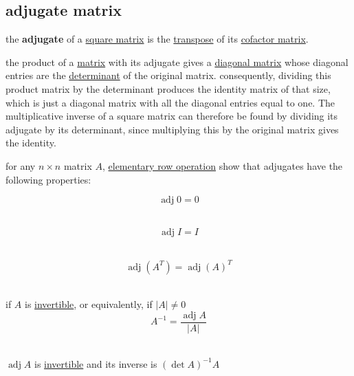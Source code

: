 \documentclass[a4paper,12pt]{article}
\DeclareMathOperator{\adj}{adj}
\begin{document}
\subsection{adjugate matrix}
\label{sec:org517aaf6}
\begin{definition}
the \textbf{adjugate} of a \hyperref[sec:orgf670bc9]{square matrix} is the \hyperref[sec:org668c066]{transpose} of its \hyperref[sec:org47e0d92]{cofactor matrix}.\\

\begin{characteristic}
the product of a \hyperref[sec:org2833a15]{matrix} with its adjugate gives a \hyperref[sec:orgaf43c3e]{diagonal matrix} whose diagonal entries are the \hyperref[sec:orgff9607b]{determinant} of the original matrix. consequently, dividing this product matrix by the determinant produces the identity matrix of that size, which is just a diagonal matrix with all the diagonal entries equal to one. The multiplicative inverse of a square matrix can therefore be found by dividing its adjugate by its determinant, since multiplying this by the original matrix gives the identity.\\
\end{characteristic}

\begin{characteristic}
for any \(n\times n\) matrix \(A\), \hyperref[sec:orgdd80885]{elementary row operation} show that adjugates have the following properties:\\

\begin{lemma}
\[\adj 0 = 0\]\\
\end{lemma}

\begin{lemma}
\[\adj I = I\]\\
\end{lemma}

\begin{lemma}
\[
  \adj\left(A^T\right) = \adj(A)^T
\]\\
\end{lemma}

\begin{lemma}
if \(A\) is \href{discrete_maths2.org}{invertible}, or equivalently, if \(|A| \neq 0\)\\
\[
  A^{-1} = \frac{\adj A}{|A|}
\]\\
\begin{entailment}
\(\adj A\) is \href{discrete_maths2.org}{invertible} and its inverse is \({(\det A)}^{-1}A\)\\
\end{entailment}


\end{lemma}
\end{characteristic}
\end{definition}
\end{document}
